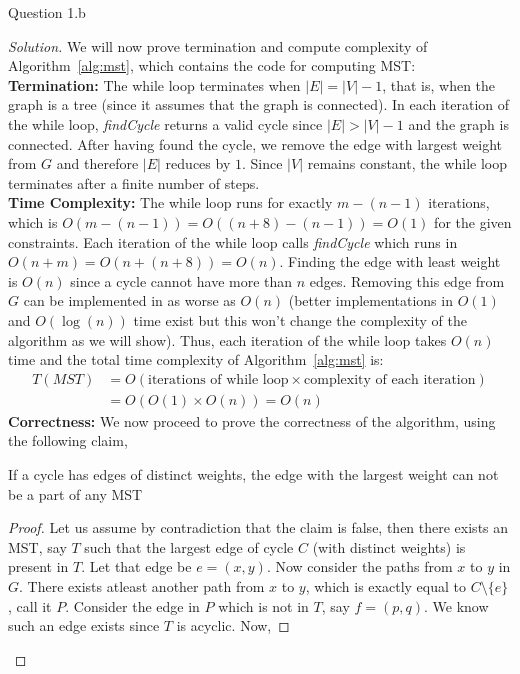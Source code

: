 \begin{solution}{Question 1.b}
\begin{proof}[Solution]
        We will now prove termination and compute complexity of Algorithm~\ref{alg:mst}, which contains the code for computing MST:\\
        \textbf{Termination:} The while loop terminates when $|E|=|V|-1$, that is, when the graph is a tree (since it assumes that the graph is connected). In each iteration of the while loop, \textit{findCycle} returns a valid cycle since $|E|>|V|-1$ and the graph is connected. After having found the cycle, we remove the edge with largest weight from $G$ and therefore $|E|$ reduces by $1$. Since $|V|$ remains constant, the while loop terminates after a finite number of steps.\\
        \textbf{Time Complexity:} The while loop runs for exactly $m-(n-1)$ iterations, which is $O(m-(n-1))=O((n+8)-(n-1))=O(1)$ for the given constraints. Each iteration of the while loop calls \textit{findCycle} which runs in $O(n+m)=O(n+(n+8))=O(n)$. Finding the edge with least weight is $O(n)$ since a cycle cannot have more than $n$ edges. Removing this edge from $G$ can be implemented in as worse as $O(n)$ (better implementations in $O(1)$ and $O(\log(n))$ time exist but this
        won't change the complexity of the algorithm as we will show). Thus, each iteration of the while loop takes $O(n)$ time and the total time complexity of Algorithm~\ref{alg:mst} is:
        \begin{equation}
            \begin{split}
                T(MST)&=O(\text{iterations of while loop}\times\text{complexity of each iteration})\\
                &=O(O(1)\times O(n))=O(n)
            \end{split}
        \end{equation}
        \textbf{Correctness:} We now proceed to prove the correctness of the algorithm, using the following claim,
        \begin{claim}\label{claim:nolarge}
            If a cycle has edges of distinct weights, the edge with the largest weight can not be a part of any MST
        \end{claim}
        \begin{proof}
            Let us assume by contradiction that the claim is false, then there exists an MST, say $T$ such that the largest edge of cycle $C$ (with distinct weights) is present in $T$. Let that edge be $e=(x, y)$. Now consider the paths from $x$ to $y$ in $G$. There exists atleast another path from $x$ to $y$, which is exactly equal to $C\setminus\{e\}$, call it $P$. Consider the edge in $P$ which is not in $T$, say $f=(p, q)$. We know such an edge exists since $T$ is acyclic. Now,

\end{proof}
\end{proof}
\end{solution}
